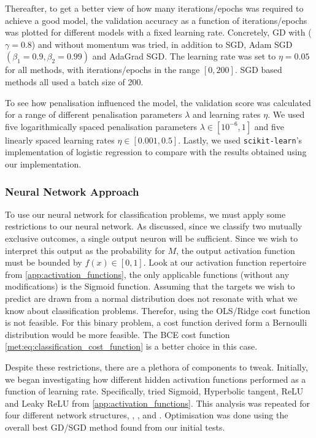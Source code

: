     Thereafter, to get a better view of how many iterations/epochs was required to achieve a good model, the validation accuracy as a function of iterations/epochs was plotted for different models with a fixed learning rate. Concretely, GD with ($\gamma = 0.8$) and without momentum was tried, in addition to SGD, Adam SGD $(\beta_1 = 0.9, \beta_2 = 0.99)$ and AdaGrad SGD. The learning rate was set to $\eta = 0.05$ for all methods, with iterations/epochs in the range $[0,200]$. SGD based methods all used a batch size of 200. 

    To see how penalisation influenced the model, the validation score was calculated for a range of different penalisation parameters $\lambda$ and learning rates $\eta$. We used five logarithmically spaced penalisation parameters $\lambda \in [10^{-6}, 1]$ and five linearly spaced learning rates $\eta \in [0.001, 0.5]$. Lastly, we used \verb|scikit-learn|'s implementation of logistic regression to compare with the results obtained using our implementation.

    \subsubsection{Neural Network Approach}
    To use our neural network for classification problems, we must apply some restrictions to our neural network. As discussed, since we classify two mutually exclusive outcomes, a single output neuron will be sufficient. Since we wish to interpret this output as the probability for $M$, the output activation function must be bounded by $f(x) \in [0,1]$. Look at our activation function repertoire from \cref{app:activation_functions}, the only applicable functions (without any modifications) is the Sigmoid function. Assuming that the targets we wish to predict are drawn from a normal distribution does not resonate with what we know about classification problems. Therefor, using the OLS/Ridge cost function is not feasible. For this binary problem, a cost function derived form a Bernoulli distribution would be more feasible. The BCE cost function \cref{met:eq:classification_cost_function} is a better choice in this case.     
    
    Despite these restrictions, there are a plethora of components to tweak. Initially, we began investigating how different hidden activation functions performed as a function of learning rate. Specifically, tried Sigmoid, Hyperbolic tangent, ReLU and Leaky ReLU from \cref{app:activation_functions}. This analysis was repeated for four different network structures, , ,  and . Optimisation was done using the overall best GD/SGD method found from our initial tests.  

